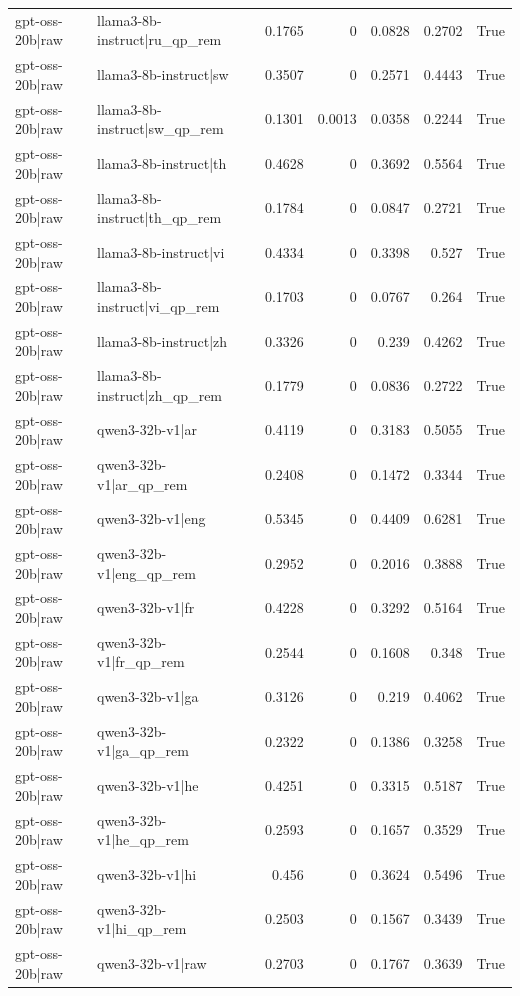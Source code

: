 \begin{table}
\begin{tabular}{l l r r r r l}
gpt-oss-20b|raw & llama3-8b-instruct|ru_qp_rem & 0.1765 & 0 & 0.0828 & 0.2702 & True \\
gpt-oss-20b|raw & llama3-8b-instruct|sw & 0.3507 & 0 & 0.2571 & 0.4443 & True \\
gpt-oss-20b|raw & llama3-8b-instruct|sw_qp_rem & 0.1301 & 0.0013 & 0.0358 & 0.2244 & True \\
gpt-oss-20b|raw & llama3-8b-instruct|th & 0.4628 & 0 & 0.3692 & 0.5564 & True \\
gpt-oss-20b|raw & llama3-8b-instruct|th_qp_rem & 0.1784 & 0 & 0.0847 & 0.2721 & True \\
gpt-oss-20b|raw & llama3-8b-instruct|vi & 0.4334 & 0 & 0.3398 & 0.527 & True \\
gpt-oss-20b|raw & llama3-8b-instruct|vi_qp_rem & 0.1703 & 0 & 0.0767 & 0.264 & True \\
gpt-oss-20b|raw & llama3-8b-instruct|zh & 0.3326 & 0 & 0.239 & 0.4262 & True \\
gpt-oss-20b|raw & llama3-8b-instruct|zh_qp_rem & 0.1779 & 0 & 0.0836 & 0.2722 & True \\
gpt-oss-20b|raw & qwen3-32b-v1|ar & 0.4119 & 0 & 0.3183 & 0.5055 & True \\
gpt-oss-20b|raw & qwen3-32b-v1|ar_qp_rem & 0.2408 & 0 & 0.1472 & 0.3344 & True \\
gpt-oss-20b|raw & qwen3-32b-v1|eng & 0.5345 & 0 & 0.4409 & 0.6281 & True \\
gpt-oss-20b|raw & qwen3-32b-v1|eng_qp_rem & 0.2952 & 0 & 0.2016 & 0.3888 & True \\
gpt-oss-20b|raw & qwen3-32b-v1|fr & 0.4228 & 0 & 0.3292 & 0.5164 & True \\
gpt-oss-20b|raw & qwen3-32b-v1|fr_qp_rem & 0.2544 & 0 & 0.1608 & 0.348 & True \\
gpt-oss-20b|raw & qwen3-32b-v1|ga & 0.3126 & 0 & 0.219 & 0.4062 & True \\
gpt-oss-20b|raw & qwen3-32b-v1|ga_qp_rem & 0.2322 & 0 & 0.1386 & 0.3258 & True \\
gpt-oss-20b|raw & qwen3-32b-v1|he & 0.4251 & 0 & 0.3315 & 0.5187 & True \\
gpt-oss-20b|raw & qwen3-32b-v1|he_qp_rem & 0.2593 & 0 & 0.1657 & 0.3529 & True \\
gpt-oss-20b|raw & qwen3-32b-v1|hi & 0.456 & 0 & 0.3624 & 0.5496 & True \\
gpt-oss-20b|raw & qwen3-32b-v1|hi_qp_rem & 0.2503 & 0 & 0.1567 & 0.3439 & True \\
gpt-oss-20b|raw & qwen3-32b-v1|raw & 0.2703 & 0 & 0.1767 & 0.3639 & True \\

\end{tabular}
\end{table}
